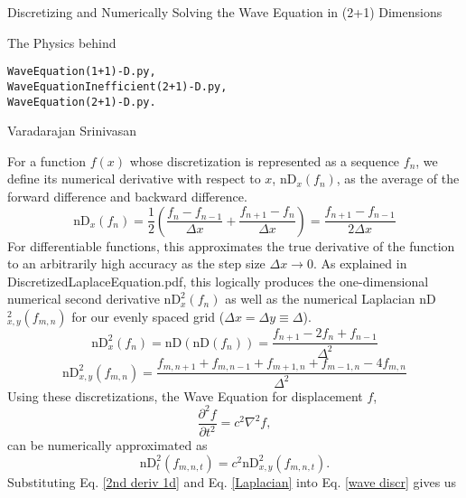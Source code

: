 \documentclass{article}
\begin{document}
\begin{flushleft}
{\large Discretizing and Numerically Solving the Wave Equation in (2+1) Dimensions}
\end{flushleft}
The Physics behind
\vspace{-2ex}
\begin{verbatim}
WaveEquation(1+1)-D.py,
WaveEquationInefficient(2+1)-D.py,
WaveEquation(2+1)-D.py.
\end{verbatim}
\begin{flushright}
\bigskip
Varadarajan Srinivasan
\end{flushright}

\smallskip

For a function $f(x)$ whose discretization is represented as a sequence $f_n$, we define its numerical derivative with respect to $x$, nD$_x(f_n)$, as the average of the forward difference and backward difference.
\begin{equation} \label{1st deriv 1d}
\mbox{nD}_x(f_n)=\frac{1}{2}\left(\frac{f_{n}-f_{n-1}}{\Delta x}+\frac{f_{n+1}-f_n}{\Delta x}\right)=\frac{f_{n+1}-f_{n-1}}{2\Delta x}
\end{equation}
For differentiable functions, this approximates the true derivative of the function to an arbitrarily high accuracy as the step size $\Delta x \rightarrow 0$. As explained in DiscretizedLaplaceEquation.pdf, this logically produces the one-dimensional numerical second derivative $\mbox{nD}_x^2(f_n)$ as well as the numerical Laplacian nD$_{x,y}^2(f_{m,n})$ for our evenly spaced grid ($\Delta x = \Delta y \equiv \Delta$).
\begin{equation} \label{2nd deriv 1d}
\mbox{nD}_x^2(f_n)=\mbox{nD}(\mbox{nD}(f_n))=\frac{f_{n+1}-2f_{n}+f_{n-1}}{\Delta^2}
\end{equation}
\begin{equation} \label{Laplacian}
\mbox{nD}_{x,y}^2(f_{m,n})=\frac{f_{m,n+1}+f_{m,n-1}+f_{m+1,n}+f_{m-1,n}-4f_{m,n}}{\Delta^2}
\end{equation}
Using these discretizations, the Wave Equation for displacement $f$,
\begin{equation} \label{wave equation}
\frac{\partial^2f}{\partial t^2}=c^2\nabla^2f,
\end{equation}
can be numerically approximated as
\begin{equation} \label{wave discr}
\mbox{nD}_t^2(f_{m,n,t})=c^2\mbox{nD}_{x,y}^2(f_{m,n,t}).
\end{equation}
Substituting Eq. \ref{2nd deriv 1d} and Eq. \ref{Laplacian} into Eq. \ref{wave discr} gives us
\end{document}
